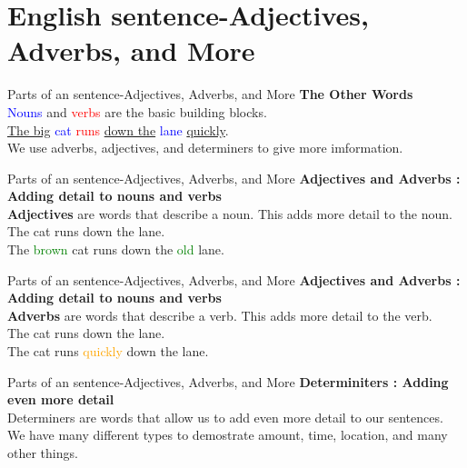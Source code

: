 \documentclass{beamer}
\begin{document}
\section{English sentence-Adjectives, Adverbs, and More}
\begin{frame}{Parts of an sentence-Adjectives, Adverbs, and More}
\centering
\textbf{The Other Words}\\
\vspace{0.2in}
\textcolor{blue}{Nouns} and \textcolor{red}{verbs} are the basic building blocks.\\
\vspace{0.2in}
\underline{The big} \textcolor{blue}{cat} \textcolor{red}{runs} \underline{down the} \textcolor{blue}{lane} \underline{quickly}.\\
\vspace{0.2in}
We use adverbs, adjectives, and determiners to give more imformation.\\   
\end{frame}
\begin{frame} {Parts of an sentence-Adjectives, Adverbs, and More}
\centering
\textbf{Adjectives and Adverbs : Adding detail to nouns and verbs}\\
\vspace{0.2in}
\textbf{Adjectives} are words that describe a noun. This adds more detail to the noun.\\
\vspace{0.2in}
The cat runs down the lane.\\
\vspace{0.2in}
The \textcolor{green}{brown} cat runs down the \textcolor{green}{old} lane.\\   
\end{frame}
\begin{frame}{Parts of an sentence-Adjectives, Adverbs, and More}
\centering
\textbf{Adjectives and Adverbs : Adding detail to nouns and verbs}\\
\vspace{0.2in}
\textbf{Adverbs} are words that describe a verb. This adds more detail to the verb.\\
\vspace{0.2in}
The cat runs down the lane.\\
\vspace{0.2in}
The cat runs \textcolor{orange}{quickly} down the lane.
\end{frame}
\begin{frame}{Parts of an sentence-Adjectives, Adverbs, and More}
\centering
\textbf{Determiniters : Adding even more detail}\\
\vspace{0.2in}
Determiners are words that allow us to add even more detail to our sentences.\\
\vspace{0.2in}
We have many different types to demostrate amount, time, location, and many other things.\\
\end{frame}
\end{document}
